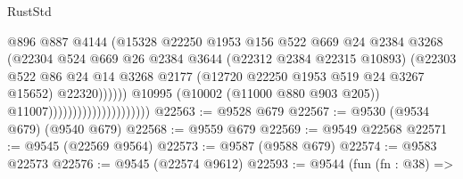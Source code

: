 \begin{lexlean}{RustStd}
\begin{coremodule}
                                                    @896
                                                    @887
                                                    @4144
                                                    (@15328
                                                      @22250
                                                      @1953
                                                      @156
                                                      @522
                                                      @669
                                                      @24
                                                      @2384
                                                      @3268
                                                      (@22304
                                                        @524
                                                        @669
                                                        @26
                                                        @2384
                                                        @3644
                                                        (@22312 @2384 @22315 @10893)
                                                        (@22303
                                                          @522
                                                          @86
                                                          @24
                                                          @14
                                                          @3268
                                                          @2177
                                                          (@12720
                                                            @22250
                                                            @1953
                                                            @519
                                                            @24
                                                            @3267
                                                            @15652)
                                                          @22320))))))
                                              @10995
                                              (@10002 (@11000 @880 @903 @205))
                                              @11007)))))))))))))))))))))
@22563 := @9528 @679
@22567 := @9530 (@9534 @679) (@9540 @679)
@22568 := @9559 @679
@22569 := @9549 @22568
@22571 := @9545 (@22569 @9564)
@22573 := @9587 (@9588 @679)
@22574 := @9583 @22573
@22576 := @9545 (@22574 @9612)
@22593 := @9544
    (fun (fn : @38) =>

\end{coremodule}
\end{lexlean}
